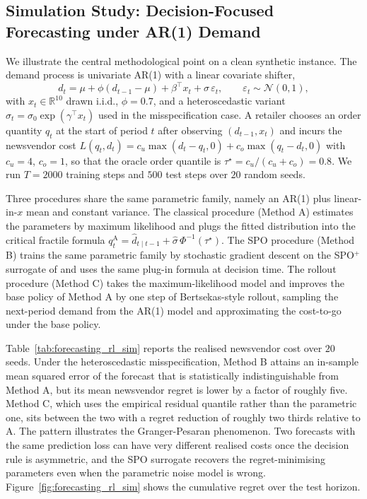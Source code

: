 \subsection{Simulation Study: Decision-Focused Forecasting under AR(1) Demand}
\label{sec:forecasting_rl_sim}

We illustrate the central methodological point on a clean synthetic instance. The
demand process is univariate AR(1) with a linear covariate shifter,
\begin{equation}
d_t = \mu + \phi (d_{t-1} - \mu) + \beta^\top x_t + \sigma\,\varepsilon_t,
\qquad \varepsilon_t \sim \mathcal N(0, 1),
\label{eq:ar1_dgp}
\end{equation}
with $x_t \in \mathbb R^{10}$ drawn i.i.d., $\phi = 0.7$, and a heteroscedastic
variant $\sigma_t = \sigma_0 \exp(\gamma^\top x_t)$ used in the misspecification
case. A retailer chooses an order quantity $q_t$ at the start of period $t$ after
observing $(d_{t-1}, x_t)$ and incurs the newsvendor cost
$L(q_t, d_t) = c_u \max(d_t - q_t, 0) + c_o \max(q_t - d_t, 0)$
with $c_u = 4$, $c_o = 1$, so that the oracle order quantile is
$\tau^\star = c_u / (c_u + c_o) = 0.8$. We run $T = 2000$ training steps and $500$
test steps over $20$ random seeds.

Three procedures share the same parametric family, namely an AR(1) plus linear-in-$x$
mean and constant variance. The classical procedure (Method A) estimates the
parameters by maximum likelihood and plugs the fitted distribution into the
critical fractile formula
$q_t^{\mathrm A} = \hat d_{t \mid t-1} + \hat\sigma\,\Phi^{-1}(\tau^\star)$.
The SPO procedure (Method B) trains the same parametric family by stochastic
gradient descent on the SPO$^+$ surrogate of \citet{ElmachtoubGrigas2022} and uses
the same plug-in formula at decision time. The rollout procedure (Method C) takes
the maximum-likelihood model and improves the base policy of Method A by one step
of Bertsekas-style rollout, sampling the next-period demand from the AR(1) model
and approximating the cost-to-go under the base policy.

Table~\ref{tab:forecasting_rl_sim} reports the realised newsvendor cost over $20$
seeds. Under the heteroscedastic misspecification, Method B attains an
in-sample mean squared error of the forecast that is statistically
indistinguishable from Method A, but its mean newsvendor regret is lower by a
factor of roughly five. Method C, which uses the empirical residual quantile
rather than the parametric one, sits between the two with a regret reduction of
roughly two thirds relative to A. The pattern illustrates the Granger-Pesaran
phenomenon. Two forecasts with the same prediction loss can have very different
realised costs once the decision rule is asymmetric, and the SPO surrogate
recovers the regret-minimising parameters even when the parametric noise model
is wrong. Figure~\ref{fig:forecasting_rl_sim} shows the cumulative regret over
the test horizon.

